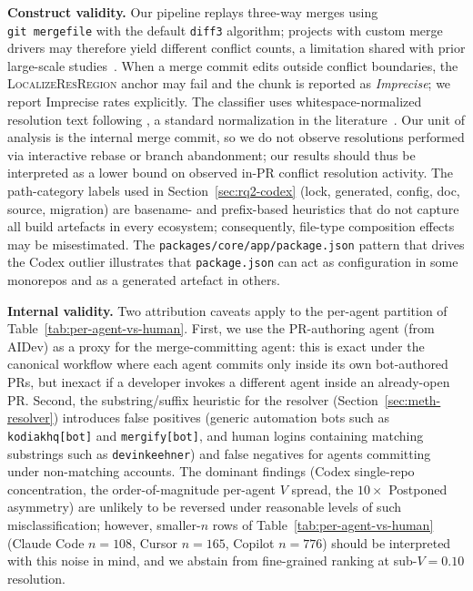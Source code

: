 \documentclass[sigconf,anonymous]{acmart}
\begin{document}
\textbf{Construct validity.} Our pipeline replays three-way merges using \texttt{git\ merge\-file} with the default \texttt{diff3} algorithm; projects with custom merge drivers may therefore yield different conflict counts, a limitation shared with prior large-scale studies~\cite{ghiotto2020nature,boll2024semi,owhadikareshk2019}. When a merge commit edits outside conflict boundaries, the \textsc{LocalizeResRegion} anchor may fail and the chunk is reported as \emph{Imprecise}; we report Imprecise rates explicitly. The classifier uses whitespace-normalized resolution text following \citet{ghiotto2020nature}, a standard normalization in the literature~\cite{elias2023mestre,camposjunior2022sbes}. Our unit of analysis is the internal merge commit, so we do not observe resolutions performed via interactive rebase or branch abandonment; our results should thus be interpreted as a lower bound on observed in-PR conflict resolution activity. The path-category labels used in Section~\ref{sec:rq2-codex} (lock, generated, config, doc, source, migration) are basename- and prefix-based heuristics that do not capture all build artefacts in every ecosystem; consequently, file-type composition effects may be misestimated. The \texttt{packages/core/app/package.json} pattern that drives the Codex outlier illustrates that \texttt{package.json} can act as configuration in some monorepos and as a generated artefact in others.

\textbf{Internal validity.} Two attribution caveats apply to the per-agent partition of Table~\ref{tab:per-agent-vs-human}. First, we use the PR-authoring agent (from AIDev) as a proxy for the merge-committing agent: this is exact under the canonical workflow where each agent commits only inside its own bot-authored PRs, but inexact if a developer invokes a different agent inside an already-open PR. Second, the substring/suffix heuristic for the resolver (Section~\ref{sec:meth-resolver}) introduces false positives (generic automation bots such as \texttt{kodiakhq[bot]} and \texttt{mergify[bot]}, and human logins containing matching substrings such as \texttt{devinkeehner}) and false negatives for agents committing under non-matching accounts. The dominant findings (Codex single-repo concentration, the order-of-magnitude per-agent $V$ spread, the $10{\times}$ Postponed asymmetry) are unlikely to be reversed under reasonable levels of such misclassification; however, smaller-$n$ rows of Table~\ref{tab:per-agent-vs-human} (Claude Code $n{=}108$, Cursor $n{=}165$, Copilot $n{=}776$) should be interpreted with this noise in mind, and we abstain from fine-grained ranking at sub-$V{=}0.10$ resolution.
\end{document}

